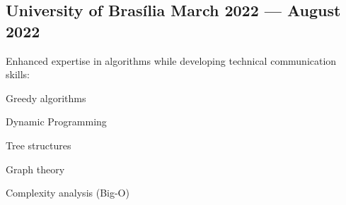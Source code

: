 \documentclass[a4paper,12pt]{article}
\begin{document}
\vspace{1.5em}
\vspace*{7pt}
\vspace{1.5em}

\subsection*{\large University of Brasília  \hfill March 2022 --- August 2022}
\vspace*{3pt}

Enhanced expertise in algorithms while developing technical communication skills:

\begin{zitemize}
    \item Greedy algorithms
    \item Dynamic Programming
    \item Tree structures
    \item Graph theory
    \item Complexity analysis (Big-O)
\end{zitemize}
\end{document}
